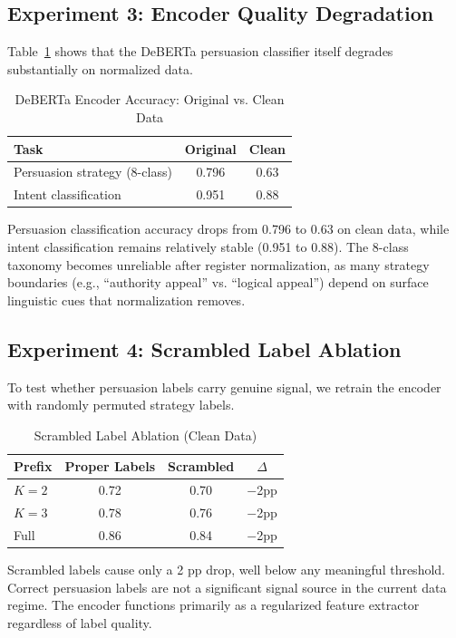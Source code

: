 \documentclass[11pt]{article}
\begin{document}
\subsection{Experiment 3: Encoder Quality Degradation}

Table~\ref{tab:encoder} shows that the DeBERTa persuasion classifier itself degrades substantially on normalized data.

\begin{table}[h]
\centering
\caption{DeBERTa Encoder Accuracy: Original vs. Clean Data}
\label{tab:encoder}
\begin{tabular}{lcc}
\toprule
\textbf{Task} & \textbf{Original} & \textbf{Clean} \\
\midrule
Persuasion strategy (8-class) & 0.796 & 0.63 \\
Intent classification & 0.951 & 0.88 \\
\bottomrule
\end{tabular}
\end{table}

Persuasion classification accuracy drops from 0.796 to 0.63 on clean data, while intent classification remains relatively stable (0.951 to 0.88). The 8-class taxonomy becomes unreliable after register normalization, as many strategy boundaries (e.g., ``authority appeal'' vs. ``logical appeal'') depend on surface linguistic cues that normalization removes.

\subsection{Experiment 4: Scrambled Label Ablation}

To test whether persuasion labels carry genuine signal, we retrain the encoder with randomly permuted strategy labels.

\begin{table}[h]
\centering
\caption{Scrambled Label Ablation (Clean Data)}
\label{tab:scrambled}
\begin{tabular}{lccc}
\toprule
\textbf{Prefix} & \textbf{Proper Labels} & \textbf{Scrambled} & \textbf{$\Delta$} \\
\midrule
$K=2$ & 0.72 & 0.70 & $-$2pp \\
$K=3$ & 0.78 & 0.76 & $-$2pp \\
Full & 0.86 & 0.84 & $-$2pp \\
\bottomrule
\end{tabular}
\end{table}

Scrambled labels cause only a 2 pp drop, well below any meaningful threshold. Correct persuasion labels are not a significant signal source in the current data regime. The encoder functions primarily as a regularized feature extractor regardless of label quality.
\end{document}
